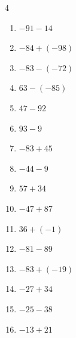 \begin{multicols}{4}
\begin{enumerate}
        \phantom{$=-134$}

  \item $-91-14$

        \phantom{$=-105$}

  \item $-84+(-98)$

        \phantom{$=-182$}

  \item $-83-(-72)$

        \phantom{$=-11$}

  \item $63-(-85)$

        \phantom{$=148$}

  \item $47-92$

        \phantom{$=-45$}

  \item $93-9$

        \phantom{$=84$}

  \item $-83+45$

        \phantom{$=-38$}

  \item $-44-9$

        \phantom{$=-53$}

  \item $57+34$

        \phantom{$=91$}

  \item $-47+87$

        \phantom{$=40$}

  \item $36+(-1)$

        \phantom{$=35$}

  \item $-81-89$

        \phantom{$=-170$}

  \item $-83+(-19)$

        \phantom{$=-102$}

  \item $-27+34$

        \phantom{$=7$}

  \item $-25-38$

        \phantom{$=-63$}

  \item $-13+21$


\end{enumerate}
\end{multicols}
